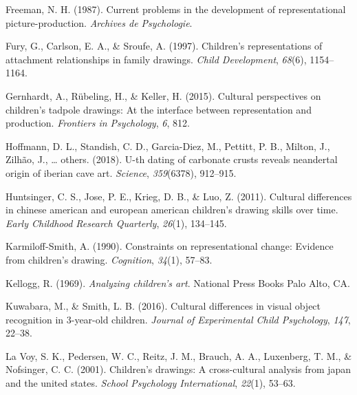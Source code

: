 \documentclass[
  man]{apa6}
\newlength{\cslhangindent}
\newlength{\cslentryspacingunit} %
\newenvironment{CSLReferences}[2] %
 {%
  \setlength{\parindent}{0pt}
  \ifodd #1
  \let\oldpar\par
  \def\par{\hangindent=\cslhangindent\oldpar}
  \fi
  \setlength{\parskip}{#2\cslentryspacingunit}
 }%
 {}
\begin{document}
\begin{CSLReferences}{1}{0}
\leavevmode{}%
Freeman, N. H. (1987). Current problems in the development of representational picture-production. \emph{Archives de Psychologie}.

\leavevmode{}%
Fury, G., Carlson, E. A., \& Sroufe, A. (1997). Children's representations of attachment relationships in family drawings. \emph{Child Development}, \emph{68}(6), 1154--1164.

\leavevmode{}%
Gernhardt, A., Rübeling, H., \& Keller, H. (2015). Cultural perspectives on children's tadpole drawings: At the interface between representation and production. \emph{Frontiers in Psychology}, \emph{6}, 812.

\leavevmode{}%
Hoffmann, D. L., Standish, C. D., Garcia-Diez, M., Pettitt, P. B., Milton, J., Zilhão, J., \ldots{} others. (2018). U-th dating of carbonate crusts reveals neandertal origin of iberian cave art. \emph{Science}, \emph{359}(6378), 912--915.

\leavevmode{}%
Huntsinger, C. S., Jose, P. E., Krieg, D. B., \& Luo, Z. (2011). Cultural differences in chinese american and european american children's drawing skills over time. \emph{Early Childhood Research Quarterly}, \emph{26}(1), 134--145.

\leavevmode{}%
Karmiloff-Smith, A. (1990). Constraints on representational change: Evidence from children's drawing. \emph{Cognition}, \emph{34}(1), 57--83.

\leavevmode{}%
Kellogg, R. (1969). \emph{Analyzing children's art}. National Press Books Palo Alto, CA.

\leavevmode{}%
Kuwabara, M., \& Smith, L. B. (2016). Cultural differences in visual object recognition in 3-year-old children. \emph{Journal of Experimental Child Psychology}, \emph{147}, 22--38.

\leavevmode{}%
La Voy, S. K., Pedersen, W. C., Reitz, J. M., Brauch, A. A., Luxenberg, T. M., \& Nofsinger, C. C. (2001). Children's drawings: A cross-cultural analysis from japan and the united states. \emph{School Psychology International}, \emph{22}(1), 53--63.


\end{CSLReferences}
\end{document}

